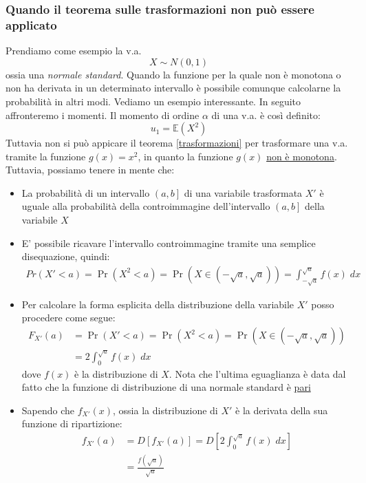 \subsubsection*{Quando il teorema sulle trasformazioni non può essere applicato}
Prendiamo come esempio la v.a.
\[
	X \sim N\left(0,1\right)
\]
ossia una \textit{normale standard}.
Quando la funzione per la quale non è monotona o non ha derivata in un determinato intervallo è possibile comunque calcolarne la probabilità in altri modi. Vediamo un esempio interessante. In seguito affronteremo i momenti. Il momento di ordine $ \alpha $ di una v.a. è così definito:
\[
	u_1=\mathbb{E}\left(X^2 \right)
\]
Tuttavia non si può appicare il teorema \ref{trasformazioni} per trasformare una v.a. tramite la funzione $ g\left(x\right) = x^2  $, in quanto la funzione $ g\left(x\right) $ \underline{non è monotona}. Tuttavia, possiamo tenere in mente che:
\begin{itemize}
	\item La probabilità di un intervallo $ \left(a,b\right] $ di una variabile trasformata $ X' $ è uguale alla probabilità della controimmagine dell'intervallo $ \left(a,b\right] $ della variabile $ X $
	\item E' possibile ricavare l'intervallo controimmagine tramite una semplice disequazione, quindi:
	      \begin{align*}
		      Pr\left(X' < a\right) =\Pr\left(X^2 < a\right) =\Pr\left(X \in \left(-\sqrt{a}, \sqrt{a}\right)\right) = \int_{-\sqrt{a}}^{\sqrt{a}} f(x) \; dx
	      \end{align*}
	\item Per calcolare la forma esplicita della distribuzione della variabile $ X' $ posso procedere come segue:
	      \begin{align*}
		      F_{X'} \left(a\right) & =\Pr\left(X' < a\right) =\Pr\left(X^2 < a\right) =\Pr\left(X \in \left(-\sqrt{a}, \sqrt{a}\right)\right) \\
		                            & =2 \int_{0}^{\sqrt{a}} f(x) \; dx
	      \end{align*}
	      dove $ f\left(x\right) $ è la distribuzione di $ X $. Nota che l'ultima eguaglianza è data dal fatto che la funzione di distribuzione di una normale standard è \underline{pari}
	\item Sapendo che $ f_{X'}\left(x\right) $, ossia la distribuzione di $ X' $ è la derivata della sua funzione di ripartizione:
	      \begin{align*}
		      f_{X'}\left(a\right) & = D\left[f_{X'}\left(a\right)\right]= D\left[2 \int_{0}^{\sqrt{a}} f(x) \; dx\right] \\
		                           & = \frac{f\left(\sqrt{a}\right)}{\sqrt{a}}
	      \end{align*}
\end{itemize}
